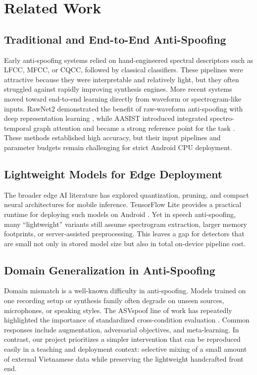 \documentclass[conference]{IEEEtran}
\begin{document}
\section{Related Work}

\subsection{Traditional and End-to-End Anti-Spoofing}

Early anti-spoofing systems relied on hand-engineered spectral descriptors such as LFCC, MFCC, or CQCC, followed by classical classifiers. These pipelines were attractive because they were interpretable and relatively light, but they often struggled against rapidly improving synthesis engines. More recent systems moved toward end-to-end learning directly from waveform or spectrogram-like inputs. RawNet2 demonstrated the benefit of raw-waveform anti-spoofing with deep representation learning \cite{b3}, while AASIST introduced integrated spectro-temporal graph attention and became a strong reference point for the task \cite{b2}. These methods established high accuracy, but their input pipelines and parameter budgets remain challenging for strict Android CPU deployment.

\subsection{Lightweight Models for Edge Deployment}

The broader edge AI literature has explored quantization, pruning, and compact neural architectures for mobile inference. TensorFlow Lite provides a practical runtime for deploying such models on Android \cite{b5}. Yet in speech anti-spoofing, many ``lightweight'' variants still assume spectrogram extraction, larger memory footprints, or server-assisted preprocessing. This leaves a gap for detectors that are small not only in stored model size but also in total on-device pipeline cost.

\subsection{Domain Generalization in Anti-Spoofing}

Domain mismatch is a well-known difficulty in anti-spoofing. Models trained on one recording setup or synthesis family often degrade on unseen sources, microphones, or speaking styles. The ASVspoof line of work has repeatedly highlighted the importance of standardized cross-condition evaluation \cite{b1}. Common responses include augmentation, adversarial objectives, and meta-learning. In contrast, our project prioritizes a simpler intervention that can be reproduced easily in a teaching and deployment context: selective mixing of a small amount of external Vietnamese data while preserving the lightweight handcrafted front end.
\end{document}
